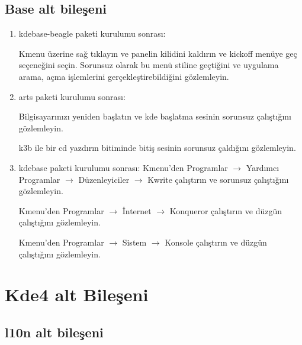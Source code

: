 \documentclass[a4paper,10pt]{article}
\begin{document}
\subsection*{Base alt bileşeni}
\begin{enumerate}
\item kdebase-beagle paketi kurulumu sonrası:

Kmenu üzerine sağ tıklayın ve panelin kilidini kaldırın ve kickoff menüye geç seçeneğini seçin. Sorunsuz olarak bu menü stiline geçtiğini ve uygulama arama, açma işlemlerini gerçekleştirebildiğini gözlemleyin.

\item arts paketi kurulumu sonrası:

Bilgisayarınızı yeniden başlatın ve kde başlatma sesinin sorunsuz çalıştığını gözlemleyin.

k3b ile bir cd yazdırın bitiminde bitiş sesinin sorunsuz çaldığını gözlemleyin.

 \item kdebase paketi kurulumu sonrası:
Kmenu'den Programlar $\rightarrow$ Yardımcı Programlar $\rightarrow$ Düzenleyiciler $\rightarrow$ Kwrite çalıştırın ve sorunsuz çalıştığını gözlemleyin.

Kmenu'den Programlar $\rightarrow$ İnternet $\rightarrow$ Konqueror çalıştırın ve düzgün çalıştığını gözlemleyin.

Kmenu'den Programlar $\rightarrow$ Sistem $\rightarrow$ Konsole çalıştırın ve düzgün çalıştığını gözlemleyin.

\end{enumerate}

\section{Kde4 alt Bileşeni}

\subsection*{l10n alt bileşeni}
\end{document}
